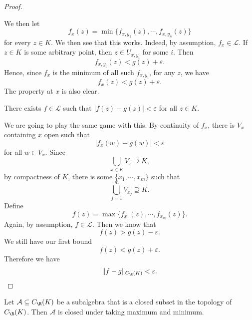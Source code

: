 \documentclass[a4paper]{article}
\begin{document}
\begin{proof}
\begin{center}
  \end{center}
  We then let
  \[
    f_x(z) = \min\{f_{x, y_1}(z), \cdots, f_{x, y_n}(z)\}
  \]
  for every $z \in K$. We then see that this works. Indeed, by assumption, $f_x \in \mathcal{L}$. If $z \in K$ is some arbitrary point, then $z \in U_{x, y_i}$ for some $i$. Then
  \[
    f_{x, y_i}(z) < g(z) + \varepsilon.
  \]
  Hence, since $f_x$ is the minimum of all such $f_{x, y_i}$, for any $z$, we have
  \[
    f_x(z) < g(z) + \varepsilon.
  \]
  The property at $x$ is also clear.
  \begin{claim}
    There exists $f \in \mathcal{L}$ such that $|f(z) - g(z)| < \varepsilon$ for all $z \in K$.
  \end{claim}
  We are going to play the same game with this. By continuity of $f_x$, there is $V_x$ containing $x$ open such that
  \[
    |f_x(w) - g(w)| < \varepsilon
  \]
  for all $w \in V_x$. Since
  \[
    \bigcup_{x\in K} V_x \supseteq K,
  \]
  by compactness of $K$, there is some $\{x_1, \cdots, x_m\}$ such that
  \[
    \bigcup_{j = 1}^m V_{x_j} \supseteq K.
  \]
  Define
  \[
    f(z) = \max\{f_{x_1}(z), \cdots, f_{x_m}(z)\}.
  \]
  Again, by assumption, $f \in \mathcal{L}$. Then we know that
  \[
    f(z) > g(z) - \varepsilon.
  \]
  We still have our first bound
  \[
    f(z) < g(z) + \varepsilon.
  \]
  Therefore we have
  \[
    \|f - g\|_{C_\R (K)} < \varepsilon.\qedhere
  \]
\end{proof}

\begin{lemma}
  Let $\mathcal{A}\subseteq C_\R(K)$ be a subalgebra that is a closed subset in the topology of $C_\R(K)$. Then $\mathcal{A}$ is closed under taking maximum and minimum.
\end{lemma}
\end{document}
